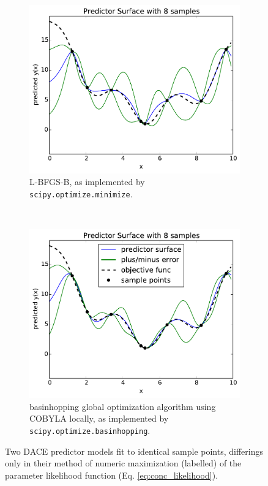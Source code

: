 \begin{figure}
        \centering
        \begin{subfigure}[t]{0.5\textwidth}
                \includegraphics[width=\textwidth]{images/likelihood_opt_ex/bad}
                \caption{L-BFGS-B\cite{}, as implemented by \texttt{scipy.optimize.minimize}. }
        \end{subfigure}%
        ~ %
        \begin{subfigure}[t]{0.5\textwidth}
                \includegraphics[width=\textwidth]{images/likelihood_opt_ex/good}
                \caption{basinhopping\cite{} global optimization algorithm using COBYLA\cite{} locally, as implemented by \texttt{scipy.optimize.basinhopping}.}
        \end{subfigure}
        \caption{Two DACE predictor models fit to identical sample points, differings only in their method of numeric maximization (labelled) of the parameter likelihood function (Eq. \ref{eq:conc_likelihood}). }\label{fig:opt_compare}
\end{figure}

